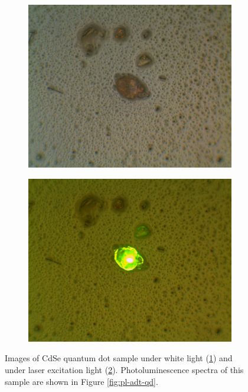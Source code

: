 \begin{figure}[h]
    \centering
    \begin{subfigure}[b]{0.45\textwidth}
        \includegraphics[width=\textwidth]{./img/qd-white-illum.png}
        \caption{}
        \label{img:qd-white}
    \end{subfigure}
    \hfill
    \begin{subfigure}[b]{0.45\textwidth}
        \includegraphics[width=\textwidth]{./img/qd-laser-illum.png}
        \caption{}
        \label{img:qd-laser}
    \end{subfigure}
    \caption{Images of CdSe quantum dot sample under white light (\ref{img:qd-white}) and under laser excitation light (\ref{img:qd-laser}). Photoluminescence spectra of this sample are shown in Figure \ref{fig:pl-adt-qd}.}
    \label{img:qd}
\end{figure}

